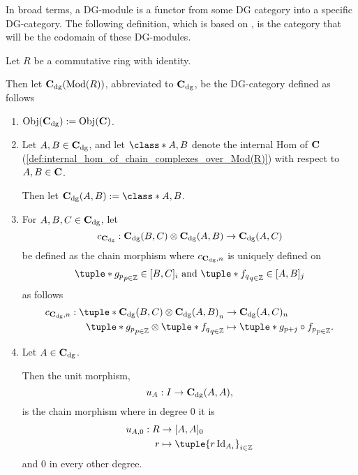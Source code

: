 In broad terms, a DG-module is a functor from some DG category into a specific DG-category. The following definition, which is based on \cite[p. 29]{Jasso-Muro_2023}, is the category that will be the codomain of these DG-modules.

\begin{definition}[\( \C_{\dg} \)]
    \label{def:c_dg_mod_r}
    Let \( R \) be a commutative ring with identity.

    Then let \emph{\( \operatorname{\mathbf{C}}_{\operatorname{dg}}(\operatorname{Mod}(R)) \)}, abbreviated to \emph{\( \C_{\dg} \)}, be the DG-category defined as follows
    \begin{enumerate}
        \item {
            \( \operatorname{Obj}(\operatorname{\mathbf{C}}_{\operatorname{dg}}) := \operatorname{Obj}(\operatorname{\mathbf{C}}) \).
        }
        \item {
            Let \( A, B \in \operatorname{\mathbf{C}}_{\operatorname{dg}} \), and let \( \class*{A, B} \) denote the internal Hom of \( \operatorname{\mathbf{C}} \) (\autoref{def:internal_hom_of_chain_complexes_over_Mod(R)}) with respect to \( A, B \in \operatorname{\mathbf{C}} \).

            Then let \( \C_{\dg}(A, B) := \class*{A, B} \).
        }
        \item {
            For \( A, B, C \in \operatorname{\mathbf{C}}_{\operatorname{dg}} \), let
            \[
                c_{\operatorname{\mathbf{C}}_{\operatorname{dg}}}: \operatorname{\mathbf{C}}_{\operatorname{dg}}(B, C) \otimes \operatorname{\mathbf{C}}_{\operatorname{dg}}(A, B) \to \operatorname{\mathbf{C}}_{\operatorname{dg}}(A, C)
            \]
            be defined as the chain morphism where \( c_{\operatorname{\mathbf{C}}_{\operatorname{dg}}, n} \) is uniquely defined on
            \[
                \tuple*{g_p}_{p \in \Zb} \in [B, C]_i \text{ and } \tuple*{f_q}_{q \in \Zb} \in [A, B]_j
            \]
            as follows
            \begin{align*}
                c_{\C_{\dg}, n}: \tuple*{ \C_{\dg}(B, C) \otimes \C_{\dg}(A, B) }_n &\to \C_{\dg}(A, C)_n \\
                \tuple*{g_p}_{p \in \Zb} \otimes \tuple*{f_q}_{q \in \Zb} &\mapsto \tuple*{g_{p + j} \circ f_p}_{p \in \Zb}.
            \end{align*}
        }
        \item {
            Let \( A \in \operatorname{\mathbf{C}}_{\operatorname{dg}} \).

            Then the unit morphism,
            \[
                u_A: I \to \operatorname{\mathbf{C}}_{\operatorname{dg}}(A, A),
            \]
            is the chain morphism where in degree \( 0 \) it is
            \begin{align*}
                u_{A, 0} : R &\to [A, A]_0 \\
                r &\mapsto \tuple{r\Id_{A_i}}_{i \in \Zb}
            \end{align*}
            and \( 0 \) in every other degree.
        }
    \end{enumerate}
\end{definition}

